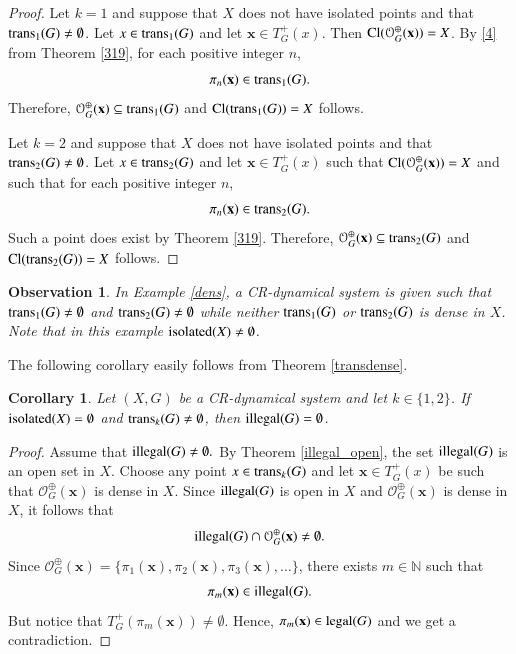 \documentclass[a4paper,12pt]{article} %
\newcommand{\orbit}{\mathcal{O}^{\oplus}}
\newcommand{\illegal}{\textup{illegal}}
\newcommand{\legal}{\textup{legal}}
\newcommand{\isolated}{\textup{isolated}}
\newcommand{\tplus}{T^{+}}
\newcommand{\trans}{\textup{trans}}
\newtheorem{corollary}[theorem]{Corollary}
\newtheorem{observation}[theorem]{Observation}
\newcommand{\Cl}  {\mathop{\rm Cl}\nolimits}
\begin{document}
\begin{proof}
Let $k=1$ and suppose that $X$ does not have isolated points and that $\trans_1(G)\neq \emptyset$. Let $x\in \trans_1(G)$ and let $\mathbf x\in \tplus_G(x)$. Then $\Cl(\orbit_G(\mathbf x))=X$. By \ref{4} from Theorem \ref{319}, for each positive integer $n$,
$$
\pi_n(\mathbf x)\in \trans_1(G).
$$
Therefore, $\orbit_G(\mathbf x)\subseteq \trans_1(G)$ and $\Cl(\trans_1(G))=X$ follows. 

Let $k=2$ and suppose that $X$ does not have isolated points and that $\trans_2(G)\neq \emptyset$.  Let $x\in \trans_2(G)$ and let $\mathbf x\in \tplus_G(x)$ such that $\Cl(\orbit_G(\mathbf x))=X$ and such that for each positive integer $n$,
$$
\pi_n(\mathbf x)\in \trans_2(G).
$$
Such a point does exist by Theorem \ref{319}.
Therefore, $\orbit_G(\mathbf x)\subseteq \trans_2(G)$ and $\Cl(\trans_2(G))=X$ follows. 
\end{proof}
\begin{observation}
In Example \ref{dens}, a CR-dynamical system is given such that $\trans_1(G)\neq \emptyset$ and $\trans_2(G)\neq \emptyset$  while neither $\trans_1(G)$ or $\trans_2(G)$ is dense in $X$.  Note that in this example $\isolated{(X)}\neq \emptyset$.
\end{observation}

 The following corollary easily follows from  Theorem \ref{transdense}.
	\begin{corollary}
		Let $(X,G)$ be a CR-dynamical system and let $k\in \{1,2\}$.  If $\isolated(X)=\emptyset$ and $ \trans_k(G)\neq \emptyset$, then $ \illegal(G)=\emptyset$.
	\end{corollary}
	\begin{proof}
		Assume that $\illegal(G) \neq \emptyset.$ By Theorem \ref{illegal_open}, the set $\illegal(G)$ is an open set in $X$. Choose any point $x\in \trans_k(G)$ and let $\mathbf x \in T_G^+ (x)$ be  such that $\orbit_G (\mathbf x)$ is dense in $X$.  Since $\illegal(G)$ is open in $X$ and $\orbit_G (\mathbf x)$ is dense in $X$, it follows that 
		$$
		\illegal(G)\cap \orbit_G (\mathbf x)\neq \emptyset.
		$$  
Since $\orbit_G (\mathbf x)=\{\pi_1(\mathbf x),\pi_2(\mathbf x),\pi_3(\mathbf x),\ldots\}$,  there exists $m \in \mathbb N$ such that 
$$
\pi_m(\mathbf x) \in \illegal(G).
$$
 But notice that $T_G^+ (\pi_m(\mathbf x)) \neq \emptyset$. Hence, $\pi_m(\mathbf x) \in \legal(G)$ and we get a contradiction.
	\end{proof}
\end{document}
